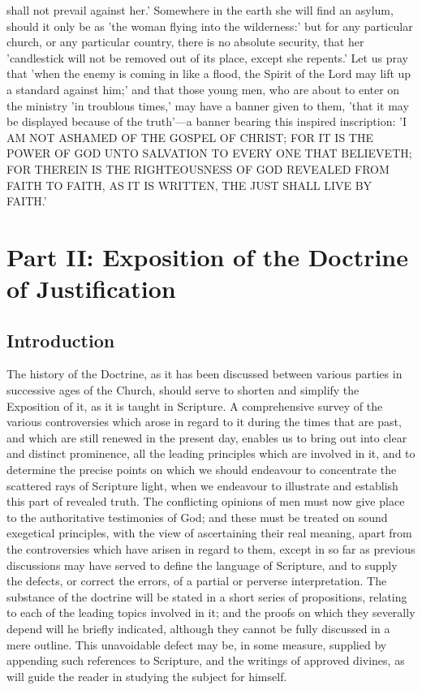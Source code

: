 \documentclass[
]{book}
\begin{document}
shall not prevail against her.' Somewhere in the earth she will find an asylum, should it only be as 'the woman flying into the wilderness:' but for any particular church, or any particular country, there is no absolute security, that her 'candlestick will not be removed out of its place, except she repents.' Let us pray that 'when the enemy is coming in like a flood, the Spirit of the Lord may lift up a standard against him;' and that those young men, who are about to enter on the ministry 'in troublous times,' may have a banner given to them, 'that it may be displayed because of the truth'---a banner bearing this inspired inscription: 'I AM NOT ASHAMED OF THE GOSPEL OF CHRIST; FOR IT IS THE POWER OF GOD UNTO SALVATION TO EVERY ONE THAT BELIEVETH; FOR THEREIN IS THE RIGHTEOUSNESS OF GOD REVEALED FROM FAITH TO FAITH, AS IT IS WRITTEN, THE JUST SHALL LIVE BY FAITH.'

\hypertarget{part-ii-exposition-of-the-doctrine-of-justification}{%
\chapter{Part II: Exposition of the Doctrine of Justification}\label{part-ii-exposition-of-the-doctrine-of-justification}}

\hypertarget{introduction}{%
\section{Introduction}\label{introduction}}

The history of the Doctrine, as it has been discussed between various parties in successive ages of the Church, should serve to shorten and simplify the Exposition of it, as it is taught in Scripture. A comprehensive survey of the various controversies which arose in regard to it during the times that are past, and which are still renewed in the present day, enables us to bring out into clear and distinct prominence, all the leading principles which are involved in it, and to determine the precise points on which we should endeavour to concentrate the scattered rays of Scripture light, when we endeavour to illustrate and establish this part of revealed truth. The conflicting opinions of men must now give place to the authoritative testimonies of God; and these must be treated on sound exegetical principles, with the view of ascertaining their real meaning, apart from the controversies which have arisen in regard to them, except in so far as previous discussions may have served to define the language of Scripture, and to supply the defects, or correct the errors, of a partial or perverse interpretation. The substance of the doctrine will be stated in a short series of propositions, relating to each of the leading topics involved in it; and the proofs on which they severally depend will he briefly indicated, although they cannot be fully discussed in a mere outline. This unavoidable defect may be, in some measure, supplied by appending such references to Scripture, and the writings of approved divines, as will guide the reader in studying the subject for himself.
\end{document}

